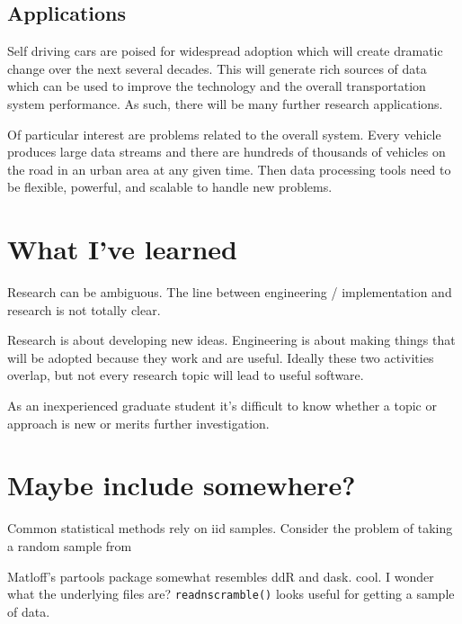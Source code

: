 \documentclass[12pt]{article}
\begin{document}
\subsection{Applications}

Self driving cars are poised for widespread adoption which will create
dramatic change over the next several decades. This will generate rich
sources of data which can be used to improve the technology and the overall
transportation system performance.\cite{swan2015connected}
As such, there will be many further research applications.

Of particular interest are problems related to the overall system. Every
vehicle produces large data streams and there are hundreds of
thousands of vehicles on the road in an urban area at any given time.
Then data processing tools need to be flexible, powerful, and scalable to
handle new problems.

\section{What I've learned}

Research can be ambiguous. The line between engineering / implementation
and research is not totally clear.

Research is about developing new ideas. Engineering is about making
things that will be adopted because they work and are useful. Ideally these
two activities overlap, but not every research topic will lead to useful
software.

As an inexperienced graduate student it's difficult to know whether a topic
or approach is new or merits further investigation.


 

\section{Maybe include somewhere?}


Common statistical methods rely on iid samples. Consider the problem of
taking a random sample from

Matloff's partools package \cite{R-partools} somewhat resembles ddR and
dask. cool. I wonder what the underlying files are?
\texttt{readnscramble()} looks useful for getting a sample of data.
\end{document}
